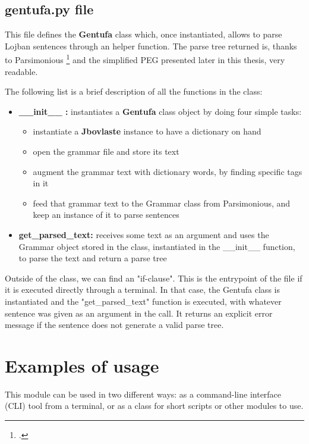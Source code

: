 \subsection*{gentufa.py file}

This file defines the \textbf{Gentufa} class which, once instantiated, allows to parse Lojban sentences through an helper function.
The parse tree returned is, thanks to Parsimonious \footcite{parsimonious} and the simplified PEG presented later in this thesis,
very readable.\newline

The following list is a brief description of all the functions in the class:

\begin{itemize}
\item \textbf{\_\_init\_\_ :} instantiates a \textbf{Gentufa} class object by doing four simple tasks:
    \begin{itemize}
        \item instantiate a \textbf{Jbovlaste} instance to have a dictionary on hand
        \item open the grammar file and store its text
        \item augment the grammar text with dictionary words, by finding specific tags in it
        \item feed that grammar text to the Grammar class from Parsimonious, and keep an instance of it to parse sentences
    \end{itemize}
\item \textbf{get\_parsed\_text:} receives some text as an argument and uses the Grammar object stored in the class, instantiated in the
\_\_init\_\_ function, to parse the text and return a parse tree
\end{itemize}

Outside of the class, we can find an "if-clause".
This is the entrypoint of the file if it is executed directly through a terminal.
In that case, the Gentufa class is instantiated and the "get\_parsed\_text" function
is executed, with whatever sentence was given as an argument in the call. It returns an explicit
error message if the sentence does not generate a valid parse tree.

\newpage

\section{Examples of usage}

This module can be used in two different ways: as a command-line interface (CLI) tool
from a terminal, or as a class for short scripts or other modules to use.

